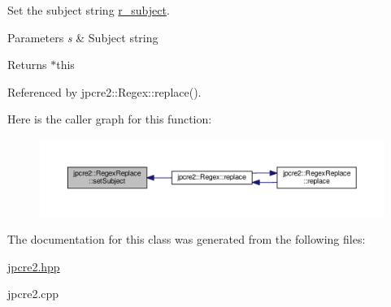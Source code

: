 Set the subject string \hyperlink{classjpcre2_1_1RegexReplace_a2290e5d9f1c2336abd431fef97e72c93}{r\+\_\+subject}. 


\begin{DoxyParams}{Parameters}
{\em s} & Subject string \\
\hline
\end{DoxyParams}
\begin{DoxyReturn}{Returns}
$\ast$this 
\end{DoxyReturn}


Referenced by jpcre2\+::\+Regex\+::replace().



Here is the caller graph for this function\+:
\nopagebreak
\begin{figure}[H]
\begin{center}
\leavevmode
\includegraphics[width=350pt]{classjpcre2_1_1RegexReplace_a46eefdb105827920bebc8436721fa4cb_icgraph}
\end{center}
\end{figure}




The documentation for this class was generated from the following files\+:\begin{DoxyCompactItemize}
\item 
\hyperlink{jpcre2_8hpp}{jpcre2.\+hpp}\item 
jpcre2.\+cpp\end{DoxyCompactItemize}
